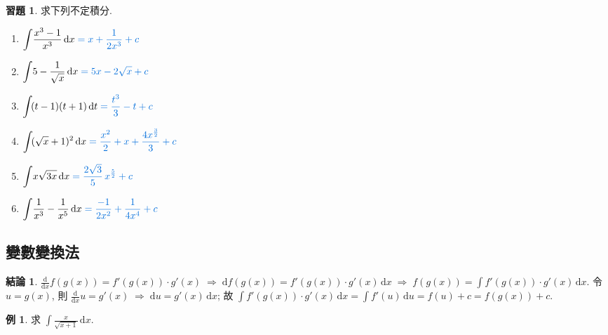 \documentclass[12pt,a4paper]{extarticle}
\newcommand{\ds}{\displaystyle}
\newcommand{\ie}{\;\Longrightarrow\;}
\theoremstyle{definition}
\newtheorem*{fact}{結論}
\newtheorem*{ex}{例}
\newtheorem*{exe}{習題}
\begin{document}
\begin{exe} 求下列不定積分. 
  \setlength{\columnsep}{-2cm}
  \begin{multicols}{2}
    \begin{enumerate}\setlength{\itemsep}{0pt}
      \item $\ds\int\!\frac{x^3 - 1}{x^3}\,\mathrm{d}x {\color{C2}\;= x + \frac{1}{2x^3} + c}$
      \item $\ds\int\!5 - \frac{1}{\sqrt{x}}\,\mathrm{d}x {\color{C2}\;= 5x - 2\sqrt{x} + c}$
      \item $\ds\int\!(t - 1)(t + 1)\,\mathrm{d}t {\color{C2}\;= \frac{t^3}{3} - t + c}$
      \item $\ds\int\!(\sqrt{x} + 1)^2\,\mathrm{d}x {\color{C2}\;= \frac{x^2}{2} + x + \frac{4 x^{\frac{3}{2}}}{3} + c}$
      \item $\ds\int\!x\sqrt{3x}\,\mathrm{d}x {\color{C2}\;= \frac{2\sqrt{3}}{5}\,x^{\frac{5}{2}} + c}$
      \item $\ds\int\!\frac{1}{x^3} - \frac{1}{x^5}\,\mathrm{d}x {\color{C2}\;= \frac{-1}{2x^2} + \frac{1}{4x^4} + c}$
    \end{enumerate} 
  \end{multicols}
\end{exe}
\subsection*{變數變換法}

\begin{fact}
  $\ds\frac{\text{d}}{\text{d}x}f(g(x)) = f'(g(x))\cdot g'(x) \ie \text{d}f(g(x)) = f'(g(x))\cdot g'(x)\,\text{d}x \ie f(g(x)) = \int f'(g(x))\cdot g'(x)\,\text{d}x$. 令 $\ds u = g(x)$, 則 $\ds\frac{\text{d}}{\text{d}x} u = g'(x)\ie \text{d} u = g'(x)\,\text{d}x$; 故 $\ds\int f'(g(x))\cdot g'(x)\,\text{d}x = \int f'(u)\,\text{d}u = f(u) + c = f(g(x)) + c$.  
\end{fact}

\begin{ex}
  求 $\ds\int\!\frac{x}{\sqrt{x + 1}}\,\mathrm{d}x$. 
\end{ex}
\end{document}
